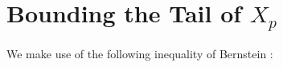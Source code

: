 \documentclass{patmorin}
\begin{document}
%



\section{Bounding the Tail of \boldmath $X_p$}
\label{probability}

We make use of the following inequality of Bernstein \cite[Corollary~2.11]{boucheron.lugosi.ea:concentration}:
\end{document}
